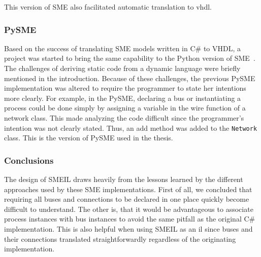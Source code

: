 This version of SME also facilitated automatic translation to \gls{vhdl}.

\subsubsection{ PySME}
Based on the success of translating SME models written in C\# to VHDL, a project
was started to bring the same capability to the Python version of
SME~\cite{asheim2016vhdl}. The challenges of deriving static code from a dynamic
language were briefly mentioned in the introduction. Because of these
challenges, the previous PySME implementation was altered to require the
programmer to state her intentions more clearly. For example, in the 
PySME, declaring a bus or instantiating a process could be done simply by
assigning a variable in the {\ttfamily wire} function of a network class. This
made analyzing the code difficult since the programmer's intention was not
clearly stated. Thus, an {\ttfamily add} method was added to the
\texttt{Network} class. This is the version of PySME used in the thesis.

\subsubsection{Conclusions}
The design of SMEIL draws heavily from the lessons learned by the different
approaches used by these SME implementations. 
First of all, we concluded that requiring all buses and connections to be
declared in one place quickly become difficult to understand. The other is, that
it would be advantageous to associate process instances with bus instances to
avoid the same pitfall as the original C\# implementation. This is also helpful
when using SMEIL as an \gls{il} since buses and their connections translated
straightforwardly regardless of the originating implementation.


